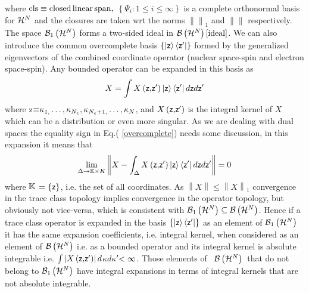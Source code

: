 where ${\rm cls\equiv closed\,linear\,span,}$ $\left\{ \Psi _{i}:1\leq i\leq
\infty \right\} $ is a complete orthonormal basis for ${\cal H}^{N}$ and the
closures are taken wrt the norms $\left\| {}\right\| _{1}$ and $\left\|
{}\right\| $ respectively. The space$\ {\cal B}_{1}\left( {\cal H}%
^{N}\right) $ forms a two-sided ideal in ${\cal B}\left( {\cal H}^{N}\right) %
\cite{ideal}$. We can also introduce the common overcomplete basis $\left\{
\left| {\sf z}\right\rangle \left\langle {\sf z}^{\prime }\right| \right\} $
formed by the generalized eigenvectors of the combined coordinate operator
(nuclear space-spin and electron space-spin). Any bounded operator can be
expanded in this basis as 
\begin{equation}
X=\int X\left( {\sf z}{\bf ,}{\sf z}^{\prime }\right) \left| {\sf z}%
\right\rangle \left\langle {\sf z}^{\prime }\right| d{\sf z}d{\sf z}^{\prime
}  \label{overcomplete}
\end{equation}%
where {\sf z}${\bf \equiv }\kappa _{1,}\ldots ,\kappa _{N_{e}},\kappa
_{N_{e}+1,}\ldots ,\kappa _{N}$, and $X\left( {\sf z}{\bf ,}{\sf z}^{\prime
}\right) $ is the integral kernel of $X$ which can be a distribution or even
more singular. As we are dealing with dual spaces the equality sign in Eq.(%
\ref{overcomplete}) needs some discussion, in this expansion it means that%
\begin{equation}
\lim_{\Delta \rightarrow {\Bbb K{\Large \times }K}}\left\| X-\int_{\Delta
}X\left( {\sf z}{\bf ,}{\sf z}^{\prime }\right) \left| {\sf z}\right\rangle
\left\langle {\sf z}^{\prime }\right| d{\sf z}d{\sf z}^{\prime }\right\| =0
\end{equation}%
where ${\Bbb K}$ $=\left\{ {\sf z}\right\} $, i.e. the set of all
coordinates. As $\left\| X\right\| \leq \left\| X\right\| _{1}$ convergence
in the trace class topology implies convergence in the operator topology,
but obviously not vice-versa, which is consistent with ${\cal B}_{1}\left( 
{\cal H}^{N}\right) \subseteq {\cal B}\left( {\cal H}^{N}\right) $. Hence if
a trace class operator is expanded in the basis $\left\{ \left| {\sf z}%
\right\rangle \left\langle {\sf z}^{\prime }\right| \right\} $ as an element
of ${\cal B}_{1}\left( {\cal H}^{N}\right) $ it has the same expansion
coefficients, i.e. integral kernel, when considered as an element of ${\cal B%
}\left( {\cal H}^{N}\right) $ i.e. as a bounded operator and its integral
kernel is absolute integrable i.e. $\int \left| X\left( {\sf z}{\bf ,}{\sf z}%
^{\prime }\right) \right| d$\underline{$\kappa $}$d$\underline{$\kappa $}$%
^{\prime }{\bf <\infty }$. Those elements of \ ${\cal B}\left( {\cal H}%
^{N}\right) $\ that do not belong to ${\cal B}_{1}\left( {\cal H}^{N}\right) 
$ have integral expansions in terms of integral kernels that are not
absolute integrable.

